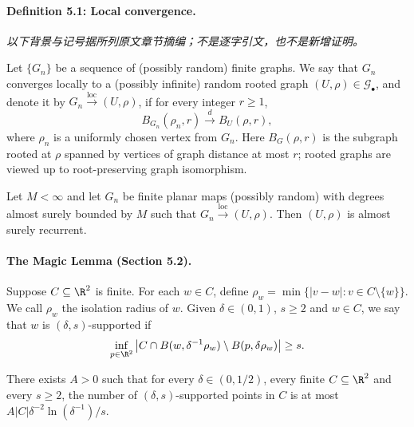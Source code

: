 \paragraph{Definition 5.1: Local convergence.}
\noindent\textit{以下背景与记号据所列原文章节摘编；不是逐字引文，也不是新增证明。}\par
Let $\{G_n\}$ be a sequence of (possibly random) finite graphs. We say that $G_n$ converges locally to a (possibly infinite) random rooted graph $(U,\rho)\in\mathcal G_\bullet$, and denote it by $G_n\xrightarrow{\mathrm{loc}}(U,\rho)$, if for every integer $r\ge1$,
\[
B_{G_n}(\rho_n,r)\xrightarrow{d}B_U(\rho,r),
\]
where $\rho_n$ is a uniformly chosen vertex from $G_n$. Here $B_G(\rho,r)$ is the subgraph rooted at $\rho$ spanned by vertices of graph distance at most $r$; rooted graphs are viewed up to root-preserving graph isomorphism.

\begin{theorem}
Let $M<\infty$ and let $G_n$ be finite planar maps (possibly random) with degrees almost surely bounded by $M$ such that $G_n\xrightarrow{\mathrm{loc}}(U,\rho)$. Then $(U,\rho)$ is almost surely recurrent.
\end{theorem}

\paragraph{The Magic Lemma (Section 5.2).}
Suppose $C\subseteq\R^2$ is finite. For each $w\in C$, define $\rho_w=\min\{|v-w|:v\in C\setminus\{w\}\}$. We call $\rho_w$ the isolation radius of $w$. Given $\delta\in(0,1)$, $s\ge2$ and $w\in C$, we say that $w$ is $(\delta,s)$-supported if
\[
\inf_{p\in\R^2}\left|C\cap B(w,\delta^{-1}\rho_w)\setminus B(p,\delta\rho_w)\right|\ge s.
\]
\begin{lemma}[5.3]
There exists $A>0$ such that for every $\delta\in(0,1/2)$, every finite $C\subseteq\R^2$ and every $s\ge2$, the number of $(\delta,s)$-supported points in $C$ is at most $A|C|\delta^{-2}\ln(\delta^{-1})/s$.
\end{lemma}

